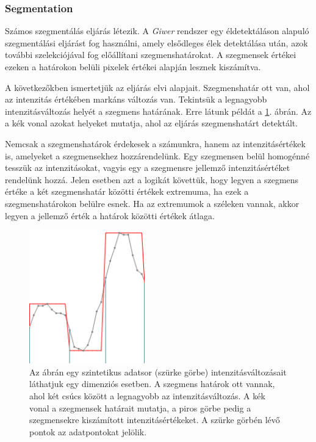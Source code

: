 \documentclass[a4paper,12pt]{article}
\begin{document}
\subsubsection{Segmentation}

Számos szegmentálás eljárás létezik. A \textit{Giwer} rendszer egy éldetektáláson alapuló szegmentálási eljárást fog használni, amely elsődleges élek detektálása után, azok további szelekciójával fog előállítani szegmenshatárokat. A szegmensek értékei ezeken a határokon belüli pixelek értékei alapján lesznek kiszámítva.

A következőkben ismertetjük az eljárás elvi alapjait. Szegmenshatár ott van, ahol az intenzitás értékében markáns változás van. Tekintsük a legnagyobb intenzitásváltozás helyét a szegmens határának. Erre látunk példát a  \ref{fig:seg1}.  ábrán. Az a kék vonal azokat helyeket mutatja, ahol az eljárás szegmenshatárt detektált. 

Nemcsak a szegmenshatárok érdekesek a számunkra, hanem az intenzitásértékek is, amelyeket a szegmensekhez hozzárendelünk. Egy szegmensen belül homogénné tesszük az intenzitásokat, vagyis egy a szegmensre jellemző intenzitásértéket rendelünk hozzá. Jelen esetben azt a logikát követtük, hogy legyen a szegmens értéke a két szegmenshatár közötti értékek extremuma, ha ezek a szegmenshatárokon belülre esnek. Ha az extremumok a széleken vannak, akkor legyen a jellemző érték a határok közötti értékek átlaga.

\begin{figure}
	\centering
	\includegraphics[width=5cm]{seg1.png}
	\caption{Az ábrán egy szintetikus adatsor (szürke görbe) intenzitásváltozásait láthatjuk egy dimenziós esetben. A szegmens határok ott vannak, ahol két csúcs között a legnagyobb az intenzitásváltozás. A kék vonal a szegmensek határait mutatja, a piros görbe pedig a szegmensekre kiszámított intenzitásértékeket. A szürke görbén lévő pontok az adatpontokat jelölik. }
	\label{fig:seg1}
\end{figure}
\end{document}
